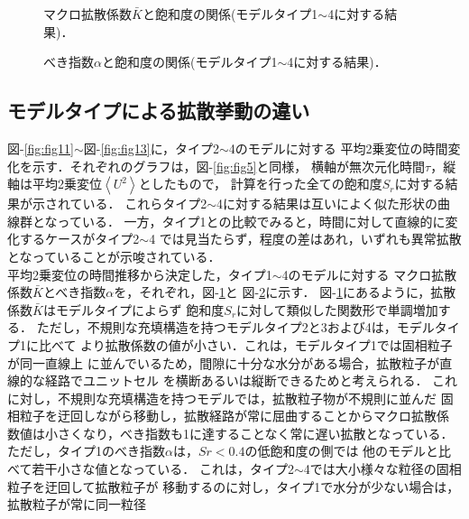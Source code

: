 \begin{figure}[h]
\begin{center}
\caption{
	マクロ拡散係数$\bar K$と飽和度の関係(モデルタイプ1$\sim$4に対する結果)．
	}
\label{fig:fig8}
\end{center}
\end{figure}
%
\begin{figure}[h]
\begin{center}
\caption{
	べき指数$\alpha$と飽和度の関係(モデルタイプ1$\sim$4に対する結果)．
	}
\label{fig:fig9}
\end{center}
\end{figure}
\subsection{モデルタイプによる拡散挙動の違い}
図-\ref{fig:fig11}$\sim$図-\ref{fig:fig13}に，タイプ2$\sim$4のモデルに対する
平均2乗変位の時間変化を示す．それぞれのグラフは，図-\ref{fig:fig5}と同様，
横軸が無次元化時間$\tau$，縦軸は平均2乗変位$\left<U^2\right>$としたもので，
計算を行った全ての飽和度$S_r$に対する結果が示されている．
これらタイプ2$\sim$4に対する結果は互いによく似た形状の曲線群となっている．
一方，タイプ1との比較でみると，時間に対して直線的に変化するケースがタイプ2$\sim$4
では見当たらず，程度の差はあれ，いずれも異常拡散となっていることが示唆されている．\\
\hspace{\parindent}
平均2乗変位の時間推移から決定した，タイプ1$\sim$4のモデルに対する
マクロ拡散係数$\bar{K}$とべき指数$\alpha$を，それぞれ，図-\ref{fig:fig8}と
図-\ref{fig:fig9}に示す．
図-\ref{fig:fig8}にあるように，拡散係数$\bar{K}$はモデルタイプによらず
飽和度$S_r$に対して類似した関数形で単調増加する．
ただし，不規則な充填構造を持つモデルタイプ2と3および4は，モデルタイプ1に比べて
より拡散係数の値が小さい．これは，モデルタイプ1では固相粒子が同一直線上
に並んでいるため，間隙に十分な水分がある場合，拡散粒子が直線的な経路でユニットセル
を横断あるいは縦断できるためと考えられる．
これに対し，不規則な充填構造を持つモデルでは，拡散粒子物が不規則に並んだ
固相粒子を迂回しながら移動し，拡散経路が常に屈曲することからマクロ拡散係
数値は小さくなり，べき指数も1に達することなく常に遅い拡散となっている．
ただし，タイプ1のべき指数$\alpha$は，$Sr<0.4$の低飽和度の側では
他のモデルと比べて若干小さな値となっている．
これは，タイプ2$\sim$4では大小様々な粒径の固相粒子を迂回して拡散粒子が
移動するのに対し，タイプ1で水分が少ない場合は，拡散粒子が常に同一粒径
